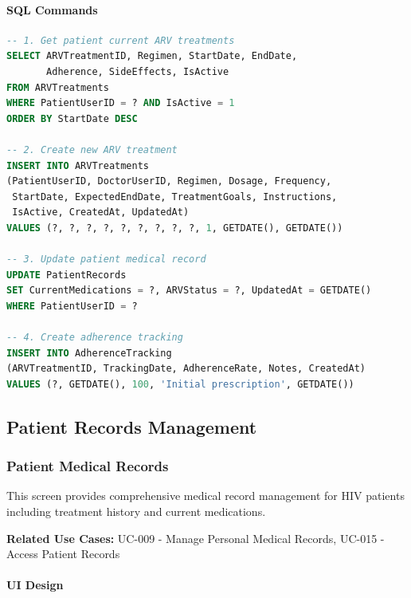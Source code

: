 \documentclass[12pt,a4paper]{article}
\begin{document}
\paragraph{SQL Commands}

\begin{lstlisting}[language=SQL]
-- 1. Get patient current ARV treatments
SELECT ARVTreatmentID, Regimen, StartDate, EndDate, 
       Adherence, SideEffects, IsActive
FROM ARVTreatments
WHERE PatientUserID = ? AND IsActive = 1
ORDER BY StartDate DESC

-- 2. Create new ARV treatment
INSERT INTO ARVTreatments 
(PatientUserID, DoctorUserID, Regimen, Dosage, Frequency,
 StartDate, ExpectedEndDate, TreatmentGoals, Instructions,
 IsActive, CreatedAt, UpdatedAt)
VALUES (?, ?, ?, ?, ?, ?, ?, ?, ?, 1, GETDATE(), GETDATE())

-- 3. Update patient medical record
UPDATE PatientRecords
SET CurrentMedications = ?, ARVStatus = ?, UpdatedAt = GETDATE()
WHERE PatientUserID = ?

-- 4. Create adherence tracking
INSERT INTO AdherenceTracking
(ARVTreatmentID, TrackingDate, AdherenceRate, Notes, CreatedAt)
VALUES (?, GETDATE(), 100, 'Initial prescription', GETDATE())
\end{lstlisting}

\subsection{Patient Records Management}

\subsubsection{Patient Medical Records}

This screen provides comprehensive medical record management for HIV patients including treatment history and current medications.

\textbf{Related Use Cases:} UC-009 - Manage Personal Medical Records, UC-015 - Access Patient Records

\paragraph{UI Design}
\end{document}
